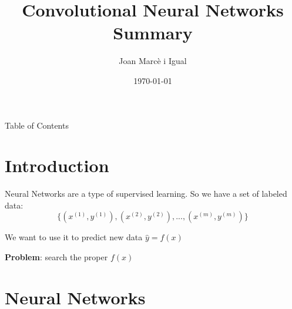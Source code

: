 \documentclass{beamer}
\title{Convolutional Neural Networks Summary}
\date{\today}
\author[Joan]{Joan Marcè i Igual}
\institute[UHN]{University Health Network}
\begin{document}
\begin{frame}
	\titlepage
\end{frame}
\begin{frame}{Table of Contents}
	\tableofcontents
\end{frame}

\section{Introduction}
\begin{frame}{\secname}
	Neural Networks are a type of supervised learning. So we have a set of labeled data:
	$$\{(x^{(1)}, y^{(1)}), (x^{(2)}, y^{(2)}), ..., (x^{(m)}, y^{(m)})\}$$
	
	We want to use it to predict new data $\hat{y} = f(x)$
	
	\textbf{Problem}: search the proper $f(x)$
\end{frame}
\section{Neural Networks}
\begin{frame}{\secname}
	
\end{frame}
\end{document}
